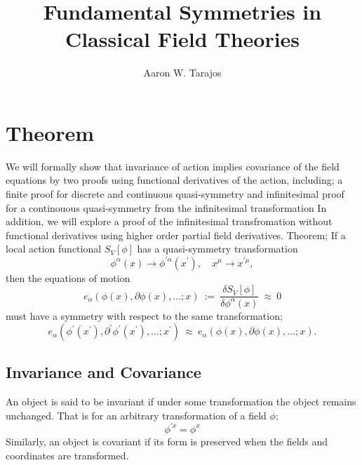 \documentclass{article}
\title{Fundamental Symmetries in Classical Field Theories}
\author{Aaron W. Tarajos}
\begin{document}
\maketitle

\section{Theorem}
We will formally show that invariance of action implies covariance of the field equations by two proofs using functional derivatives of the action, including; a finite proof for discrete and continuous quasi-symmetry and infinitesimal proof for a continouous quasi-symmetry from the infinitesimal transformation%
In addition, we will explore a proof of the infinitesimal transfromation without functional derivatives using higher order partial field derivatives. Theorem;
If a local action functional $S_V\left[\phi\right]$ has a quasi-symmetry transformation
\begin{equation}
	\phi^\alpha (x) \to \phi^{\prime\alpha}(x^\prime), \quad x^\mu \to x^{\prime\mu},
\end{equation}
then the equations of motion
\begin{equation}
	e_{\alpha}(\phi(x),\partial\phi(x),\ldots ; x)~:=~\frac{\delta S_V[\phi]}{\delta \phi^{\alpha}(x)}~\approx~0
\end{equation}
must have a symmetry with respect to the same transformation;
\begin{equation}
	e_{\alpha}(\phi^{\prime}(x^{\prime}),\partial^{\prime}\phi^{\prime}(x^{\prime}),\ldots ; x^{\prime})~\approx~e_{\alpha}(\phi(x),\partial\phi(x),\ldots ; x).
\end{equation}

\subsection{Invariance and Covariance}
An object is said to be invariant if under some transformation the object remains unchanged. That is for an arbitrary transformation of a field $\phi$;
\[
	\phi^{\prime x}  = \phi^x
\]
Similarly, an object is covariant if its form is preserved when the fields and coordinates are transformed.
\end{document}
